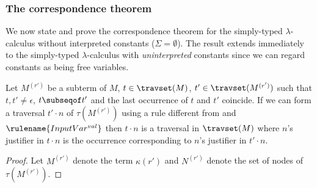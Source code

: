 \subsubsection{The correspondence theorem}
We now state and prove the correspondence theorem for the
simply-typed $\lambda$-calculus without interpreted constants
($\Sigma = \emptyset$). The result extends immediately to the
simply-typed $\lambda$-calculus with \emph{uninterpreted} constants
since we can regard constants as being free variables.

\begin{lemma}
\label{lem:local_traversal_progression}
Let $M^{(r')}$ be a subterm of $M$, $t \in \travset(M)$,
$t' \in \travset(M^{(r')})$ such that $t,t' \neq \epsilon$, $t\subseqof t'$
and the last occurrence of $t$ and $t'$ coincide.
If we can form a traversal $t' \cdot n$ of $\tau(M^{(r')})$ using a rule different from  and $\rulename{InputVar^{val}}$ then
$ t \cdot n$ is a traversal in $\travset(M)$
where $n$'s justifier in $t \cdot n$ is the occurrence corresponding
to $n$'s justifier in $t' \cdot n$.
\end{lemma}
\begin{proof}
  Let $M^{(r')}$ denote the term $\kappa(r')$ and
  $N^{(r')}$ denote the set of nodes of $\tau(M^{(r')})$.

\end{proof}


